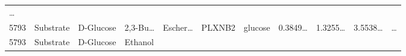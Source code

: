 \documentclass[
]{article}
\begin{document}
\begin{longtable}[]{@{}lllllllllll@{}}
\begin{minipage}[t]{0.03\columnwidth}
\ldots{}\strut
\end{minipage}\tabularnewline
\begin{minipage}[t]{0.03\columnwidth}\raggedright
5793\strut
\end{minipage} & \begin{minipage}[t]{0.07\columnwidth}\raggedright
Substrate\strut
\end{minipage} & \begin{minipage}[t]{0.07\columnwidth}\raggedright
D-Glucose\strut
\end{minipage} & \begin{minipage}[t]{0.09\columnwidth}\raggedright
2,3-Bu\ldots{}\strut
\end{minipage} & \begin{minipage}[t]{0.07\columnwidth}\raggedright
Escher\ldots{}\strut
\end{minipage} & \begin{minipage}[t]{0.07\columnwidth}\raggedright
PLXNB2\strut
\end{minipage} & \begin{minipage}[t]{0.09\columnwidth}\raggedright
glucose\strut
\end{minipage} & \begin{minipage}[t]{0.07\columnwidth}\raggedright
0.3849\ldots{}\strut
\end{minipage} & \begin{minipage}[t]{0.07\columnwidth}\raggedright
1.3255\ldots{}\strut
\end{minipage} & \begin{minipage}[t]{0.07\columnwidth}\raggedright
3.5538\ldots{}\strut
\end{minipage} & \begin{minipage}[t]{0.03\columnwidth}\raggedright
\ldots{}\strut
\end{minipage}\tabularnewline
\begin{minipage}[t]{0.03\columnwidth}\raggedright
5793\strut
\end{minipage} & \begin{minipage}[t]{0.07\columnwidth}\raggedright
Substrate\strut
\end{minipage} & \begin{minipage}[t]{0.07\columnwidth}\raggedright
D-Glucose\strut
\end{minipage} & \begin{minipage}[t]{0.09\columnwidth}\raggedright
Ethanol\strut
\end{minipage} & \begin{minipage}[t]{0.07\columnwidth}\raggedright

\end{minipage}
\end{longtable}
\end{document}
